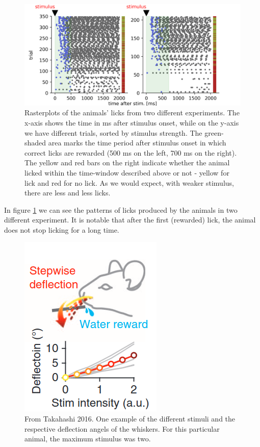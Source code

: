 \documentclass[
10pt, %
a4paper, %
oneside, %
headinclude,footinclude, %
BCOR5mm, %
]{scrartcl}
\begin{document}
\begin{figure}[tb]
\centering 
\includegraphics[width=0.8\columnwidth]{lickplot_double.png} 
\caption[Licks]{Rasterplots of the animals' licks from two different experiments. The x-axis shows the time in ms after stimulus onset, while on the y-axis we have different trials, sorted by stimulus strength. The green-shaded area marks the time period after stimulus onset in which correct licks are rewarded (500 ms on the left, 700 ms on the right). The yellow and red bars on the right indicate whether the animal licked within the time-window described above or not - yellow for lick and red for no lick. As we would expect, with weaker stimulus, there are less and less licks.} %
\label{fig:licks} 
\end{figure}

In figure \ref{fig:licks} we can see the patterns of licks produced by the animals in two different experiment. It is notable that after the first (rewarded) lick, the animal does not stop licking for a long time.

\begin{figure}[tb]
\centering 
\includegraphics[width=0.5\columnwidth]{mouse.png} 
\caption[Mouse]{From Takahashi 2016. One example of the different stimuli and the respective deflection angels of the whiskers. For this particular animal, the maximum stimulus was two.} %
\label{fig:mouse} 
\end{figure}
\end{document}
